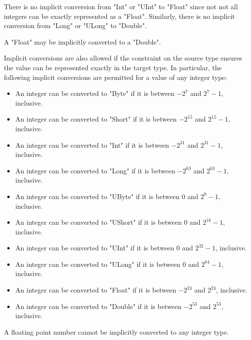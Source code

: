 There is no implicit conversion from \xcd"Int" or
\xcd"UInt" to
\xcd"Float" since not not all integers can be 
exactly represented as a
\xcd"Float".
Similarly, there is no implicit conversion from \xcd"Long" or
\xcd"ULong" to
\xcd"Double".

A \xcd"Float" may be implicitly converted to a \xcd"Double".

Implicit conversions are also allowed if the constraint on the
source type ensures the value can be represented exactly in the
target type.  In particular,
the following implicit conversions
are permitted for a value of any integer type:
\begin{itemize}
\item
An integer can be converted 
to \xcd"Byte" if it is between $-2^{7}$ and $2^{7}-1$, inclusive. 

\item
An integer can be converted 
to \xcd"Short" if it is between $-2^{15}$ and $2^{15}-1$, inclusive. 

\item
An integer can be converted 
to \xcd"Int" if it is between $-2^{31}$ and $2^{31}-1$, inclusive. 

\item
An integer can be converted 
to \xcd"Long" if it is between $-2^{63}$ and $2^{63}-1$, inclusive. 

\item
An integer can be converted 
to \xcd"UByte" if it is between $0$ and $2^{8}-1$, inclusive. 

\item
An integer can be converted 
to \xcd"UShort" if it is between $0$ and $2^{16}-1$, inclusive. 
\item

An integer can be converted 
to \xcd"UInt" if it is between $0$ and $2^{32}-1$, inclusive. 
\item

An integer can be converted 
to \xcd"ULong" if it is between $0$ and $2^{64}-1$, inclusive. 

\item
An integer can be converted 
to \xcd"Float" if it is between $-2^{24}$ and $2^{24}$, inclusive. 

\item
An integer can be converted 
to \xcd"Double" if it is between $-2^{53}$ and $2^{53}$, inclusive.
\end{itemize}

A floating point number cannot be implicitly converted to any 
integer type.


